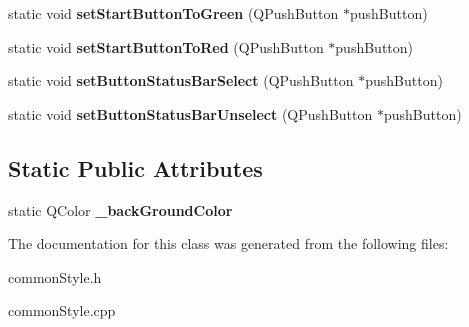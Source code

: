 \begin{DoxyCompactItemize}
\item 
\mbox{\label{class_common_style_a3cc171d4a73f5e8b9360c5fb35435d78}} 
static void {\bfseries set\+Start\+Button\+To\+Green} (Q\+Push\+Button $\ast$push\+Button)
\item 
\mbox{\label{class_common_style_a1ac46f0a17f5e0dcfebd8408f82920c3}} 
static void {\bfseries set\+Start\+Button\+To\+Red} (Q\+Push\+Button $\ast$push\+Button)
\item 
\mbox{\label{class_common_style_a0b2630a7ec00bb9f036c8bae70c391a8}} 
static void {\bfseries set\+Button\+Status\+Bar\+Select} (Q\+Push\+Button $\ast$push\+Button)
\item 
\mbox{\label{class_common_style_a75fdf21b0bd011263558ae8c6bce2965}} 
static void {\bfseries set\+Button\+Status\+Bar\+Unselect} (Q\+Push\+Button $\ast$push\+Button)
\end{DoxyCompactItemize}
\subsection*{Static Public Attributes}
\begin{DoxyCompactItemize}
\item 
\mbox{\label{class_common_style_a47f2802ffb2c83dade0d52107f8df9a1}} 
static Q\+Color {\bfseries \+\_\+back\+Ground\+Color}
\end{DoxyCompactItemize}


The documentation for this class was generated from the following files\+:\begin{DoxyCompactItemize}
\item 
common\+Style.\+h\item 
common\+Style.\+cpp\end{DoxyCompactItemize}
